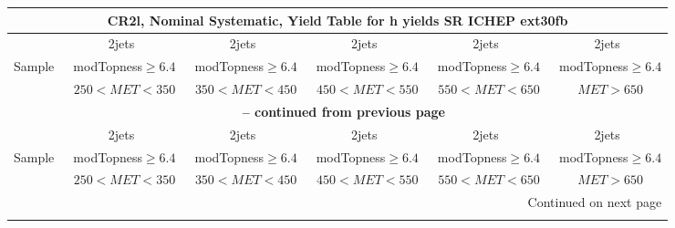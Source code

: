 \documentclass{article}
\begin{document}
 
 
\begin{longtable}{|l|c|c|c|c|c|} 
 
\multicolumn{6}{c}{ CR2l, Nominal Systematic, Yield Table for h yields SR ICHEP ext30fb }\\* \hline 
  & 2jets  & 2jets  & 2jets  & 2jets  & 2jets \\* 
Sample  & ~modTopness$\ge6.4$  & ~modTopness$\ge6.4$  & ~modTopness$\ge6.4$  & ~modTopness$\ge6.4$  & ~modTopness$\ge6.4$ \\* 
  & ~$250<MET<350$  & ~$350<MET<450$  & ~$450<MET<550$  & ~$550<MET<650$  & ~$MET>650$ \\* 
\hline \hline 
\endfirsthead 
 
\multicolumn{6}{c}{{\bfseries \tablename\ \thetable{} -- continued from previous page}}\\* \hline 
  & 2jets  & 2jets  & 2jets  & 2jets  & 2jets \\* 
Sample  & ~modTopness$\ge6.4$  & ~modTopness$\ge6.4$  & ~modTopness$\ge6.4$  & ~modTopness$\ge6.4$  & ~modTopness$\ge6.4$ \\* 
  & ~$250<MET<350$  & ~$350<MET<450$  & ~$450<MET<550$  & ~$550<MET<650$  & ~$MET>650$ \\* 
\hline \hline 
\endhead 
 
\multicolumn{6}{|r|}{{Continued on next page}}\\* \hline 
\endfoot 
 
 
\endlastfoot 
 

\end{longtable}
\end{document}
